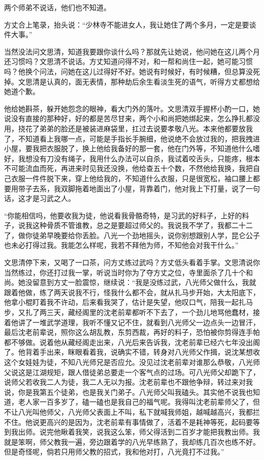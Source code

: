 两个师弟不说话，他们也不知道。

方丈合上笔录，抬头说：“少林寺不能进女人，我让她住了两个多月，一定是要谈件大事。”

当然没法问文思清，知道我要跟你谈什么吗？那就先让她说，他问她在这儿两个月还习惯吗？文思清不说话。方丈知道问得不对，和一帮和尚住一起，她可能习惯吗？他换个问法，问她在这儿过得好不好。她说有时候好，有时候糟，但总算没死掉。文思清是认真的，面无表情，那种劫后余生看淡生死的语气，听得方丈都想给她道个歉。

他给她斟茶，躲开她怨念的眼神，看大门外的落叶。文思清双手握杯小酌一口，她说没有直接的那种好，好的都是苦尽甘来，两个小和尚把她绑起来，怎么挣扎都没用，挠花了弟弟的脸还是被装进麻袋里，扛过去说要孝敬八光。本来他都要放我了，不知道看上我哪一点，可能是手指长手腕细，他说绝不会放过我的，把我拽进小屋，要我把衣服脱了，换上他给我备好的那一套，他在门外等，不知道他什么嗜好，我想没有刀没有绳子，我用什么办法可以自杀，我试着咬舌头，只能疼，根本不可能流血而死，再进来时见我还没换，他给查五十个数，不然他给我换，我把自己衣服一件件脱下来，穿上他给我的，不知道什么衣服，只是很宽松，袖口腰上都要用带子去系，我双脚拖着地面出了小屋，背靠着门，他对我上下打量，说了一句话，这才是习武之人。

“你能相信吗，他要收我为徒，他说看我骨骼奇特，是习武的好料子，上好的料子，说我这种骨质不管谁教，总之是要超过师父的。我说我不学了，我都二十二了，做你徒弟早晚要给你丢脸。八光一个劲地摇头，说你别想跟别人学，昆仑公子也未必打得过我。我能怎么样呢，我若不拜他为师，不知他会对我干什么。”

文思清停下来，又喝了一口茶，问方丈练过武吗？方丈低头看着手掌。文思清说你当然练过，你还打过我一掌，听说当时你为了夺方丈之位，寺里面杀了几十个和尚。她没留意到方丈一脸震惊，继续说：“我是没练过武，八光师父做什么，我就跟着他做，练了两天说我不行，怪我什么都不会，就从扎马步开始，大太阳底下，他拿小棍盯着我不许动，后来看我哭了，估计是失望，他叹口气，陪我一起扎马步，又扎了两三天，藏经阁里的沈老前辈都听不下去了，一个劲儿地骂他蠢材，接着他讲了一堆武学道理，我听不懂又记不住，就看到八光师父一边点头一边冒汗，最后沈老前辈说，照你这么胡乱教，东剪西裁，再好的料子，恐怕被你剪得连手帕都不够做。说着他从藏经阁走出来，八光后来告诉我，沈老前辈已经六七年没出阁了。他背着手出来，眯眼看着我，说确实不错，转身对八光师父作揖，说沈某想收这个女娃娃为徒，不知八光师兄是否应允。没见过沈老前辈对谁那么恭敬，八光师父说这是江湖规矩，跟人借徒弟总要走一个客气点的过场。可八光师父却跪下了，说师父若收我二人为徒，我二人无以为报。沈老前辈也不跟他争辩，转过来对我说，你是我第五个徒弟，也是我关门弟子。八光师父叫我磕头。其实他不说我也知道，老人家一百多岁了，磕一磕也是我自己的福气呢。我得叫沈老前辈师父了，但不让八光叫他师父，八光师父表面上不叫，私下就喊我师姐，越喊越高兴，我都拦不住。他说更高兴的是因为，沈老前辈有事情做了，活着不是耗神等死，起码要等到我出师。说完他瞅着我笑，说我这么笨，师父得活到二百岁才能把我教出师。我就是笨啊，师父教我一遍，旁边跟着学的八光早练熟了，我却练几百次也练不好。但是奇怪呢，倘若只用师父教的招式，我和他对打，八光竟打不过我。”

